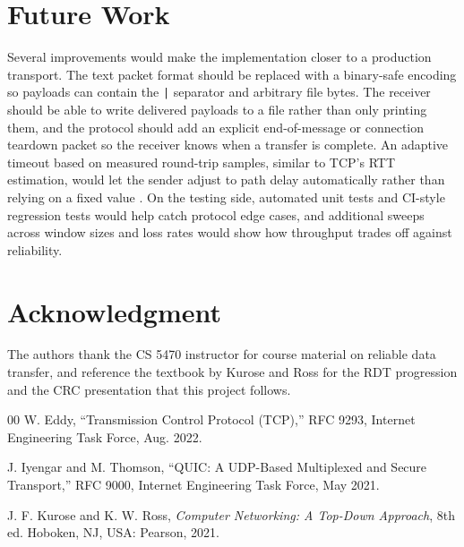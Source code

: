 \documentclass[conference]{IEEEtran}
\begin{document}
\section{Future Work}
Several improvements would make the implementation closer to a production
transport. The text packet format should be replaced with a binary-safe
encoding so payloads can contain the \texttt{|} separator and arbitrary
file bytes. The receiver should be able to write delivered payloads to a
file rather than only printing them, and the protocol should add an
explicit end-of-message or connection teardown packet so the receiver
knows when a transfer is complete. An adaptive timeout based on measured
round-trip samples, similar to TCP's RTT estimation, would let the sender adjust
to path delay automatically rather than relying on a fixed value \cite{b3}. On the testing
side, automated unit tests and CI-style regression tests would help catch
protocol edge cases, and additional sweeps across window sizes and loss rates
would show how throughput trades off against reliability.

\section*{Acknowledgment}
The authors thank the CS 5470 instructor for course material on reliable
data transfer, and reference the textbook by Kurose and Ross for the RDT
progression and the CRC presentation that this project follows.

\begin{thebibliography}{00}
 W. Eddy, ``Transmission Control Protocol (TCP),'' RFC 9293,
Internet Engineering Task Force, Aug. 2022.

 J. Iyengar and M. Thomson, ``QUIC: A UDP-Based Multiplexed and
Secure Transport,'' RFC 9000, Internet Engineering Task Force, May 2021.

 J. F. Kurose and K. W. Ross, \textit{Computer Networking: A
Top-Down Approach}, 8th ed. Hoboken, NJ, USA: Pearson, 2021.

\end{thebibliography}
\end{document}
